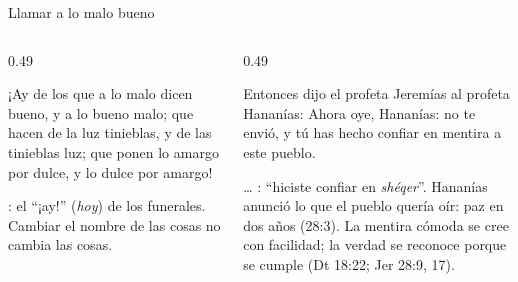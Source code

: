 \begin{frame}{Llamar a lo malo bueno}
\begin{columns}[t,onlytextwidth]
\begin{column}{0.49\textwidth}
\begin{cita}¡Ay de los que a lo malo dicen bueno, y a lo bueno malo; que hacen de la luz tinieblas, y de las tinieblas luz; que ponen lo amargo por dulce, y lo dulce por amargo!\end{cita}
\scriptsize{}: el ``¡ay!'' (\emph{hoy}) de los funerales. Cambiar el nombre de las cosas no cambia las cosas.
\end{column}
\begin{column}{0.49\textwidth}
\begin{cita}Entonces dijo el profeta Jeremías al profeta Hananías: Ahora oye, Hananías: \SENOR{} no te envió, y tú has hecho confiar en mentira a este pueblo.\end{cita}
\scriptsize{}\ldots{} : ``hiciste confiar en \emph{shéqer}''. Hananías anunció lo que el pueblo quería oír: paz en dos años (28:3). La mentira cómoda se cree con facilidad; la verdad se reconoce porque se cumple (Dt 18:22; Jer 28:9, 17).
\end{column}
\end{columns}
\end{frame}

